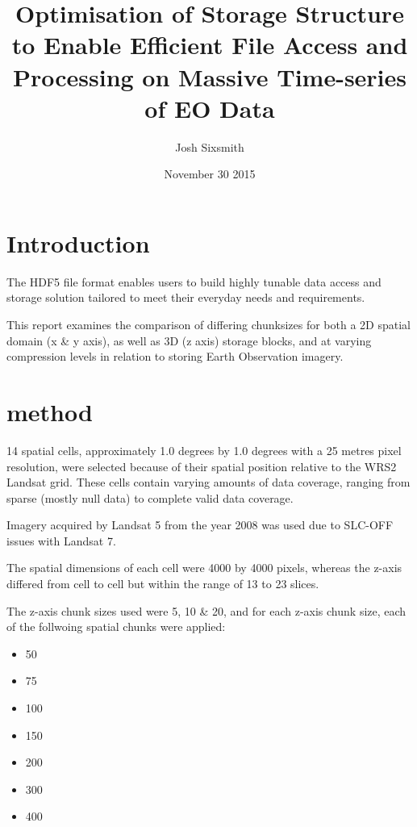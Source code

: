 \documentclass[a4paper]{article}
\title{Optimisation of Storage Structure to Enable Efficient File Access and\\ Processing on Massive Time-series of EO Data}
\date{November 30 2015}
\author{Josh Sixsmith}
\begin{document}
  \maketitle
  \newpage

  \section{Introduction}

    \begin{flushleft}
    The HDF5 file format enables users to build highly tunable data access and storage solution tailored to meet their everyday needs and requirements. \par
    This report examines the comparison of differing chunksizes for both a 2D spatial domain (x \& y axis), as well as 3D (z axis) storage blocks, and at varying compression levels in relation to storing Earth Observation imagery.
    \end{flushleft}

  \section{method}

    \begin{flushleft}
    14 spatial cells, approximately 1.0 degrees by 1.0 degrees with a 25 metres pixel resolution, were selected because of their spatial position relative to the WRS2 Landsat grid. These cells contain varying amounts of data coverage, ranging from sparse (mostly null data) to complete valid data coverage.   \par
    Imagery acquired by Landsat 5 from the year 2008 was used due to SLC-OFF issues with Landsat 7. \par
    The spatial dimensions of each cell were 4000 by 4000 pixels, whereas the z-axis differed from cell to cell but within the range of 13 to 23 slices. \par
    The z-axis chunk sizes used were 5, 10 \& 20, and for each z-axis chunk size, each of the follwoing spatial chunks were applied:
    \end{flushleft}

    \begin{itemize}
      \item 50
      \item 75
      \item 100
      \item 150
      \item 200
      \item 300
      \item 400
    \end{itemize}
\end{document}
